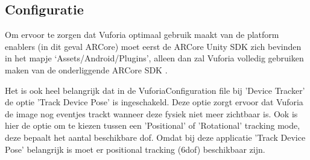 \subsection{Configuratie}
Om ervoor te zorgen dat Vuforia optimaal gebruik maakt van de platform enablers (in dit geval ARCore) moet eerst de ARCore Unity SDK zich bevinden in het mapje `Assets/Android/Plugins', alleen dan zal Vuforia volledig gebruiken maken van de onderliggende ARCore SDK \autocite{VuforiaARCore}.

Het is ook heel belangrijk dat in de VuforiaConfiguration file bij 'Device Tracker' de optie 'Track Device Pose' is ingeschakeld. Deze optie zorgt ervoor dat Vuforia de image nog eventjes trackt wanneer deze fysiek niet meer zichtbaar is. Ook is hier de optie om te kiezen tussen een 'Positional' of 'Rotational' tracking mode, deze bepaalt het aantal beschikbare \acrlong{dof}. Omdat bij deze applicatie 'Track Device Pose' belangrijk is moet er positional tracking (\acrshort{6dof}) beschikbaar zijn.

